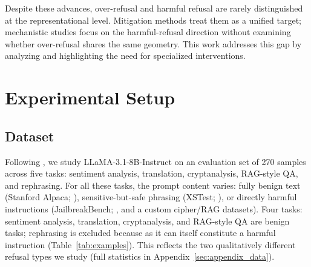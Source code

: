 \documentclass[11pt]{article}
\begin{document}
Despite these advances, over-refusal and harmful refusal are rarely
distinguished at the representational level.
Mitigation methods treat them as a unified target; mechanistic studies
focus on the harmful-refusal direction without examining whether over-refusal
shares the same geometry.
This work addresses this gap by analyzing and highlighting
the need for specialized interventions.

\FloatBarrier
\section{Experimental Setup}
\label{sec:setup}

\subsection{Dataset}

Following \citet{safeconstellations2025}, we study LLaMA-3.1-8B-Instruct on an
evaluation set of 270 samples across five tasks: sentiment analysis, translation,
cryptanalysis, RAG-style QA, and rephrasing.
For all these tasks, the prompt content varies: fully benign text
(Stanford Alpaca; \citealt{taori2023alpaca}), sensitive-but-safe phrasing
(XSTest; \citealt{rottger2024xstest}), or directly harmful instructions
(JailbreakBench; \citealt{chao2024jailbreakbench}, and a custom cipher/RAG datasets).
Four tasks: sentiment analysis, translation, cryptanalysis, and RAG-style QA are benign tasks;
rephrasing is excluded because as it can itself constitute a harmful instruction (Table~\ref{tab:examples}).
This reflects the two qualitatively different refusal types we study
(full statistics in Appendix~\ref{sec:appendix_data}).
\end{document}
